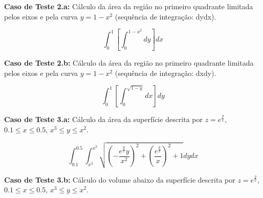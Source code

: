 \documentclass[a4,12pt]{horizon-theme}
\begin{document}
{\bf Caso de Teste 2.a:} Cálculo da área da região no primeiro quadrante limitada pelos eixos e pela curva $y = 1 - x^2$ (sequência de integração: dydx).

\begin{equation}
  \int_0^1 \left[ \int_0^{1-x^2} dy \right] dx
\end{equation}


{\bf Caso de Teste 2.b:} Cálculo da área da região no primeiro quadrante limitada pelos eixos e pela curva $y = 1 - x^2$ (sequência de integração: dxdy).


\begin{equation}
  \int_0^1 \left[ \int_0^{\sqrt{1-y}} dx \right] dy
\end{equation}



{\bf Caso de Teste 3.a:} Cálculo da área da superfície descrita por $z = e^{\frac{y}{x}}$, $0.1 \le x \le 0.5$, $x^3 \le y \le x^2$.

\begin{equation}
  \displaystyle\int _{0.1}^{0.5}\int _{x^3}^{x^2}\sqrt{\left(-\frac{e^{\frac{y}{x}}y}{x^2}\right)^2+\left(\frac{e^{\frac{y}{x}}}{x}\right)^2+1}dydx
\end{equation}




{\bf Caso de Teste 3.b:} Cálculo do volume abaixo da superfície descrita por $z = e^{\frac{y}{x}}$, $0.1 \le x \le 0.5$, $x^3 \le y \le x^2$.
\end{document}
